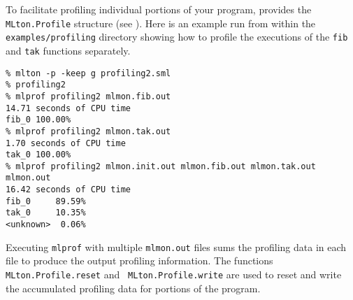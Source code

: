To facilitate profiling individual portions of your program, {\mlton}
provides the {\tt MLton.Profile} structure (see ).
Here is an example run from within the {\tt examples/profiling}
directory showing how to profile the executions of the {\tt fib} and
{\tt tak} functions separately.

\begin{verbatim}
% mlton -p -keep g profiling2.sml
% profiling2
% mlprof profiling2 mlmon.fib.out
14.71 seconds of CPU time
fib_0 100.00%
% mlprof profiling2 mlmon.tak.out
1.70 seconds of CPU time
tak_0 100.00%
% mlprof profiling2 mlmon.init.out mlmon.fib.out mlmon.tak.out mlmon.out
16.42 seconds of CPU time
fib_0     89.59%
tak_0     10.35%
<unknown>  0.06%
\end{verbatim}

Executing {\tt mlprof} with multiple {\tt mlmon.out} files sums the
profiling data in each file to produce the output profiling
information.  The functions {\tt MLton.Profile.reset} and {\tt
  MLton.Profile.write} are used to reset and write the accumulated
profiling data for portions of the program.


